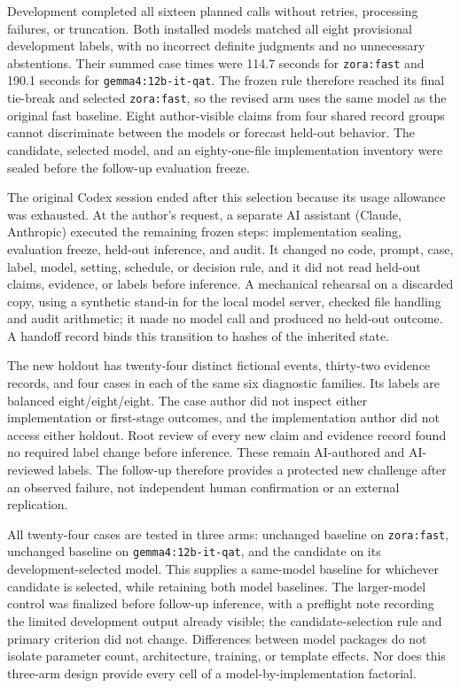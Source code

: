 Development completed all sixteen planned calls without retries, processing failures, or truncation. Both installed models matched all eight provisional development labels, with no incorrect definite judgments and no unnecessary abstentions. Their summed case times were 114.7 seconds for \texttt{zora:fast} and 190.1 seconds for \texttt{gemma4:12b-it-qat}. The frozen rule therefore reached its final tie-break and selected \texttt{zora:fast}, so the revised arm uses the same model as the original fast baseline. Eight author-visible claims from four shared record groups cannot discriminate between the models or forecast held-out behavior. The candidate, selected model, and an eighty-one-file implementation inventory were sealed before the follow-up evaluation freeze.

The original Codex session ended after this selection because its usage allowance was exhausted. At the author's request, a separate AI assistant (Claude, Anthropic) executed the remaining frozen steps: implementation sealing, evaluation freeze, held-out inference, and audit. It changed no code, prompt, case, label, model, setting, schedule, or decision rule, and it did not read held-out claims, evidence, or labels before inference. A mechanical rehearsal on a discarded copy, using a synthetic stand-in for the local model server, checked file handling and audit arithmetic; it made no model call and produced no held-out outcome. A handoff record binds this transition to hashes of the inherited state.

The new holdout has twenty-four distinct fictional events, thirty-two evidence records, and four cases in each of the same six diagnostic families. Its labels are balanced eight/eight/eight. The case author did not inspect either implementation or first-stage outcomes, and the implementation author did not access either holdout. Root review of every new claim and evidence record found no required label change before inference. These remain AI-authored and AI-reviewed labels. The follow-up therefore provides a protected new challenge after an observed failure, not independent human confirmation or an external replication.

All twenty-four cases are tested in three arms: unchanged baseline on \texttt{zora:fast}, unchanged baseline on \texttt{gemma4:12b-it-qat}, and the candidate on its development-selected model. This supplies a same-model baseline for whichever candidate is selected, while retaining both model baselines. The larger-model control was finalized before follow-up inference, with a preflight note recording the limited development output already visible; the candidate-selection rule and primary criterion did not change. Differences between model packages do not isolate parameter count, architecture, training, or template effects. Nor does this three-arm design provide every cell of a model-by-implementation factorial.


